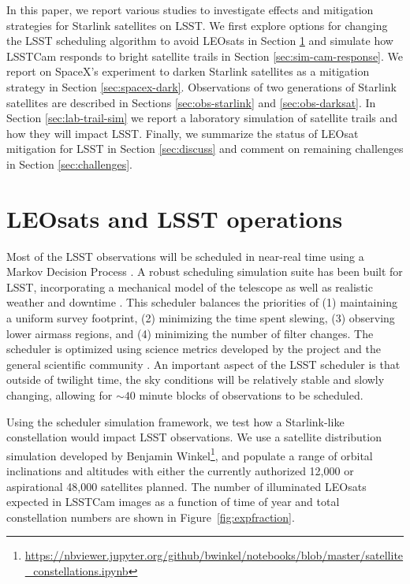 \documentclass[twocolumn,trackchanges]{aastex63}
\begin{document}
In this paper, we report various studies to investigate effects and mitigation strategies for Starlink satellites on LSST. We first explore options for changing the LSST scheduling algorithm to avoid LEOsats in Section \ref{sec:leosat-survey} and simulate how LSSTCam responds to bright satellite trails in Section
\ref{sec:sim-cam-response}. We report on SpaceX's experiment to darken Starlink satellites as a mitigation strategy in Section \ref{sec:spacex-dark}. Observations of two generations of Starlink satellites are
described in Sections \ref{sec:obs-starlink} and \ref{sec:obs-darksat}. In Section \ref{sec:lab-trail-sim} we report a laboratory simulation of satellite trails and how they will impact LSST. Finally, we summarize the status of LEOsat mitigation for LSST in Section \ref{sec:discuss} and comment on remaining challenges in Section \ref{sec:challenges}.


\section{LEOsats and LSST operations}
\label{sec:leosat-survey}

Most of the LSST observations will be scheduled in near-real time using a Markov Decision Process \citep{Naghib2019}. A robust scheduling simulation suite has been built for LSST, incorporating a mechanical model of the telescope as well as realistic weather and downtime \citep{Delgado06}. This scheduler balances the priorities of (1) maintaining a uniform survey footprint, (2) minimizing the time spent slewing, (3) observing lower airmass regions, and (4) minimizing the number of filter changes. The scheduler is optimized using science metrics developed by the project and the general scientific community \citep{Jones2014}. An important aspect of the LSST scheduler is that outside of twilight time, the sky conditions will be relatively stable and slowly changing, allowing for $\sim40$ minute blocks of observations to be scheduled.

Using the scheduler simulation framework, we test how a Starlink-like constellation would impact LSST observations.  We use a satellite distribution simulation developed by Benjamin Winkel\footnote{\url{https://nbviewer.jupyter.org/github/bwinkel/notebooks/blob/master/satellite_constellations.ipynb}}, and populate a range of orbital inclinations and altitudes with either the currently authorized 12,000 or aspirational 48,000 satellites planned.
The number of illuminated LEOsats expected in LSSTCam images as a function of time of year and total constellation numbers are shown in Figure~\ref{fig:expfraction}.
\end{document}
